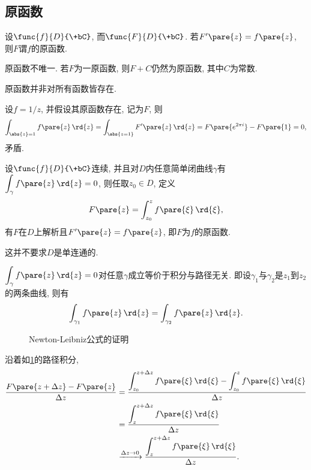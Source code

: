 \documentclass{ctexart}
\begin{document}
\subsection{原函数} %
\label{sub:原函数}

\begin{definition}[原函数]
    设$\func{f}{D}{\+bC}$, 而$\func{F}{D}{\+bC}$. 若$F'\pare{z}=f\pare{z}$, 则$F$谓$f$的原函数.
\end{definition}
\begin{remark}
    原函数不唯一. 若$F$为一原函数, 则$F+C$仍然为原函数, 其中$C$为常数.
\end{remark}
原函数并非对所有函数皆存在.
\begin{ex}
    设$f=1/z$, 并假设其原函数存在, 记为$F$, 则
    \[ \int_{\abs{z}=1}f\pare{z}\,\rd{z} = \int_{\abs{z=1}}F'\pare{z}\,\rd{z} = F\pare{e^{2\pi i}} - F\pare{1} = 0, \]
    矛盾.
\end{ex}
\begin{theorem}
    \label{thm:原函数的存在性}
    设$\func{f}{D}{\+bC}$连续, 并且对$D$内任意简单闭曲线$\gamma$有$\displaystyle \int_\gamma f\pare{z}\,\rd{z} = 0$, 则任取$z_0 \in D$, 定义
    \[ F\pare{z} = \int_{z_0}^z f\pare{\xi}\,\rd{\xi}, \]
    有$F$在$D$上解析且$F'\pare{z} = f\pare{z}$, 即$F$为$f$的原函数.
\end{theorem}
\begin{remark}
    这并不要求$D$是单连通的.
\end{remark}
\begin{remark}
    $\displaystyle \int_\gamma f\pare{z}\,\rd{z} = 0$对任意$\gamma$成立等价于积分与路径无关. 即设$\gamma_1$与$\gamma_2$是$z_1$到$z_2$的两条曲线, 则有
    \[ \int_{\gamma_1} f\pare{z}\,\rd{z} = \int_{\gamma_2}f\pare{z}\,\rd{z}. \]
\end{remark}
\begin{figure}[ht]
    \centering
    \caption{Newton-Leibniz公式的证明}
    \label{fig:Newton-Leibniz公式的证明}
\end{figure}
沿着如\cref{fig:Newton-Leibniz公式的证明}的路径积分,
\begin{align*}
    \frac{F\pare{z+\Delta z} - F\pare{z}}{\Delta z} &= \frac{\displaystyle \int_{z_0} ^{z+\Delta z} f\pare{\xi}\,\rd{\xi} - \int_{z_0}^z f\pare{\xi}\,\rd{\xi}}{\Delta z} \\
    &= \frac{\displaystyle \int_z^{z+\Delta z}f\pare{\xi}\,\rd{\xi}}{\Delta z} \\
    & \xrightarrow{\Delta z \rightarrow 0} \frac{\displaystyle \int_z^{z+\Delta z}f\pare{\xi}\,\rd{\xi}}{\Delta z}.
\end{align*}
\end{document}
